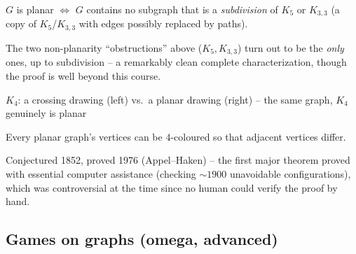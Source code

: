 \documentclass[11pt]{article}
\begin{document}
\bigskip
\begin{theorem}
$G$ is planar $\iff$ $G$ contains no subgraph that is a \emph{subdivision} of $K_5$ or $K_{3,3}$ (a copy of $K_5$/$K_{3,3}$ with edges possibly replaced by paths).
\end{theorem}
\begin{note}
The two non-planarity ``obstructions'' above ($K_5,K_{3,3}$) turn out to be the \emph{only} ones, up to subdivision -- a remarkably clean complete characterization, though the proof is well beyond this course.
\end{note}

\begin{center}
\qquad
{}
\end{center}
\begin{center}
\small $K_4$: a crossing drawing (left) vs.\ a planar drawing (right) -- the same graph, $K_4$ genuinely is planar
\end{center}

\begin{theorem}
Every planar graph's vertices can be $4$-coloured so that adjacent vertices differ.
\end{theorem}
\begin{note}
Conjectured 1852, proved 1976 (Appel--Haken) -- the first major theorem proved with essential computer assistance (checking $\sim1900$ unavoidable configurations), which was controversial at the time since no human could verify the proof by hand.
\end{note}

\subsection{Games on graphs (omega, advanced)}
\label{sec:12-6}
\end{document}
